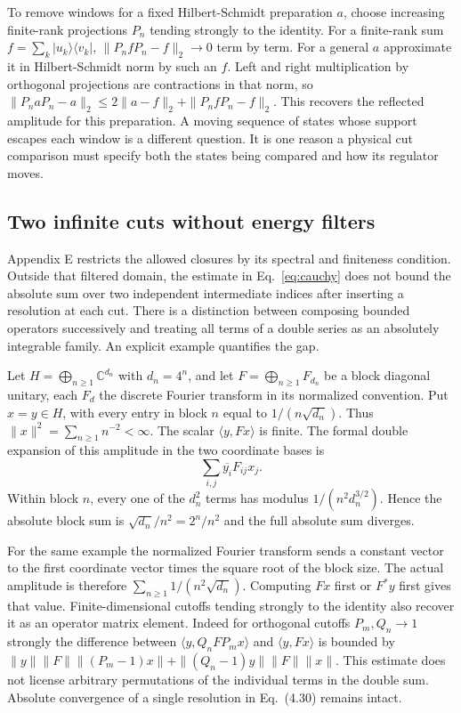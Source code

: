 \documentclass[11pt,letterpaper]{article}
\newcommand{\CC}{\mathbb C}
\begin{document}
To remove windows for a fixed Hilbert-Schmidt preparation \(a\), choose
increasing finite-rank projections \(P_n\) tending strongly to the identity.
For a finite-rank sum \(f=\sum_k |u_k\rangle\langle v_k|\),
\(\|P_n fP_n-f\|_2\to0\) term by term. For a general \(a\) approximate
it in Hilbert-Schmidt norm by such an \(f\). Left and right
multiplication by orthogonal projections are contractions in that norm,
so \(\|P_n aP_n-a\|_2\le2\|a-f\|_2+\|P_n fP_n-f\|_2\).
This recovers the reflected amplitude for this preparation.
A moving sequence of states whose support escapes each window is a
different question. It is one reason a physical cut comparison must
specify both the states being compared and how its regulator moves.

\subsection{Two infinite cuts without energy filters}
Appendix E restricts the allowed closures by its spectral and finiteness
condition. Outside that filtered domain, the estimate in
Eq.~\eqref{eq:cauchy} does not bound the absolute sum over two
independent intermediate indices after inserting a resolution at each cut.
There is a distinction between composing bounded operators successively
and treating all terms of a double series as an absolutely integrable
family. An explicit example quantifies the gap.

\begin{example}
\label{ex:fourier}
Let \(H=\bigoplus_{n\geq1}\CC^{d_n}\) with \(d_n=4^n\), and let
\(F=\bigoplus_{n\geq1}F_{d_n}\) be a block diagonal unitary, each
\(F_d\) the discrete Fourier transform in its normalized convention.
Put \(x=y\in H\), with every entry in block \(n\) equal to
\(1/(n\sqrt{d_n})\). Thus \(\|x\|^2=\sum_{n\geq1}n^{-2}<\infty\).
The scalar \(\langle y,Fx\rangle\) is finite. The formal double expansion
of this amplitude in the two coordinate bases is
\[
 \sum_{i,j}\overline{y_i}F_{ij}x_j .
\]
Within block \(n\), every one of the \(d_n^2\) terms has modulus
\(1/(n^2 d_n^{3/2})\). Hence the absolute block sum is
\(\sqrt{d_n}/n^2=2^n/n^2\) and the full absolute sum diverges.
\end{example}

For the same example the normalized Fourier transform sends a constant
vector to the first coordinate vector times the square root of the block
size. The actual amplitude is therefore
\(\sum_{n\geq1}1/(n^2\sqrt{d_n})\). Computing \(Fx\) first or \(F^*y\)
first gives that value. Finite-dimensional cutoffs tending strongly to the
identity also recover it as an operator matrix element. Indeed for
orthogonal cutoffs \(P_m,Q_n\to1\) strongly the difference between
\(\langle y,Q_n F P_m x\rangle\) and \(\langle y,Fx\rangle\) is bounded by
\(\|y\|\|F\|\|(P_m-1)x\|+\|(Q_n-1)y\|\|F\|\|x\|\).
This estimate does not license arbitrary permutations of the individual
terms in the double sum. Absolute convergence of a single resolution in
Eq.~(4.30) remains intact.
\end{document}
